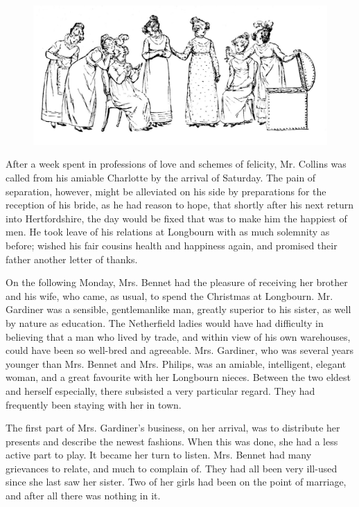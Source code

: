 \begin{figure}[htbp]
    \centering
    \includegraphics[width=\textwidth]{illustrations/i_204_a.jpg}
\end{figure}


After a week spent in professions of love and schemes of felicity, Mr. Collins was called from his amiable Charlotte by the arrival of Saturday. The pain of separation, however, might be alleviated on his side by preparations for the reception of his bride, as he had reason to hope, that shortly after his next return into Hertfordshire, the day would be fixed that was to make him the happiest of men. He took leave of his relations at Longbourn with as much solemnity as before; wished his fair cousins health and happiness again, and promised their father another letter of thanks.

On the following Monday, Mrs. Bennet had the pleasure of receiving her brother and his wife, who came, as usual, to spend the Christmas at Longbourn. Mr. Gardiner was a sensible, gentlemanlike man, greatly superior to his sister, as well by nature as education. The Netherfield ladies would have had difficulty in believing that a man who lived by trade, and within view of his own warehouses, could have been so well-bred and agreeable. Mrs. Gardiner, who was several years younger than Mrs. Bennet and Mrs. Philips, was an amiable, intelligent, elegant woman, and a great favourite with her Longbourn nieces. Between the two eldest and herself especially, there subsisted a very particular regard. They had frequently been staying with her in town.

The first part of Mrs. Gardiner's business, on her arrival, was to distribute her presents and describe the newest fashions. When this was done, she had a less active part to play. It became her turn to listen. Mrs. Bennet had many grievances to relate, and much to complain of. They had all been very ill-used since she last saw her sister. Two of her girls had been on the point of marriage, and after all there was nothing in it.

